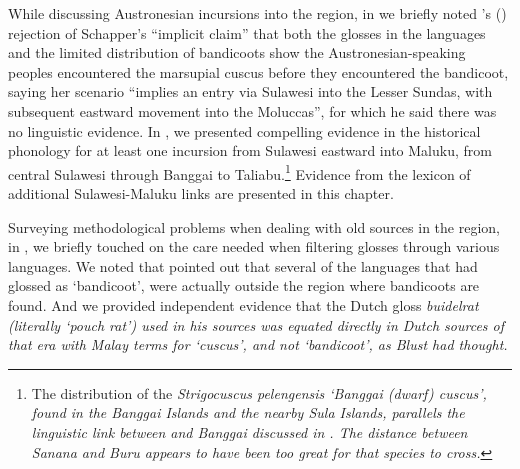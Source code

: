 While discussing Austronesian incursions into the region,
in  we briefly noted \citeauthor{Blust2012b}'s (\citeyear[74]{Blust2012b}) rejection
of Schapper's “implicit claim” that both the glosses in the languages
and the limited distribution of bandicoots show the Austronesian-speaking
peoples encountered the marsupial cuscus before they encountered
the bandicoot, saying her scenario “implies an entry via Sulawesi into the Lesser
Sundas, with subsequent eastward movement into the Moluccas”,
for which he said there was no linguistic evidence.
In , we presented compelling evidence in the historical
phonology for at least one incursion from Sulawesi eastward into
Maluku, from central Sulawesi through Banggai to Taliabu.\footnote{
		The distribution of the \it{Strigocuscus pelengensis} ‘Banggai
		(dwarf) cuscus’, found in the Banggai Islands
		and the nearby Sula Islands,
		parallels the linguistic link between 
		and Banggai discussed in .
		The distance between Sanana
		and Buru appears to have been too great for that species to cross.}
 Evidence from the lexicon of additional Sulawesi-Maluku links
are presented in this chapter.

Surveying methodological problems when dealing with old sources
in the region, in , we briefly touched on the care needed when
filtering glosses through various languages.
We noted that \citet{Schapper2011} pointed out that several of
the languages that \citet{Blust1982} had glossed as ‘bandicoot’,
were actually outside the region where bandicoots are found.
And we provided independent evidence that the Dutch gloss \it{buidelrat}
(literally ‘pouch rat’) used in his sources was equated directly
in Dutch sources of that era with Malay terms for ‘cuscus’,
and not ‘bandicoot’, as Blust had thought.

